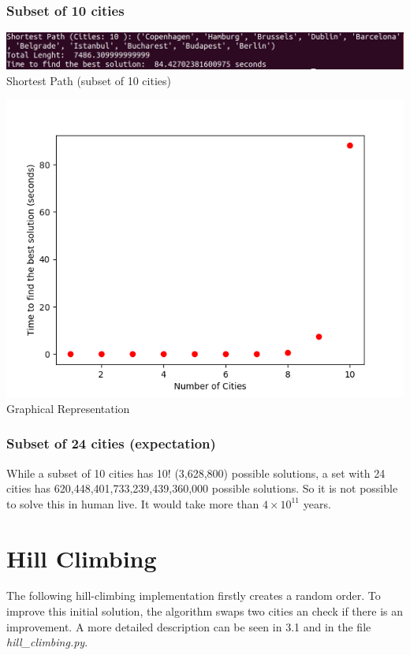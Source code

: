 \documentclass[10pt,a4paper]{article}
\begin{document}
	\subsubsection{Subset of 10 cities}
	\begin{center}
		\includegraphics[width=1\linewidth]{pictures/exhaustiveSearch/cities10}
		\\
		Shortest Path (subset of 10 cities)
		\\
	\end{center}
	\begin{center}
		\includegraphics[width=0.8\linewidth]{pictures/exhaustiveSearch/exhaustive_search10}
		\\
		Graphical Representation
		\\
	\end{center}
	
	
	\subsubsection{Subset of 24 cities (expectation)}
	While a subset of 10 cities has 10! (3,628,800) possible solutions, a set with 24 cities has  620,448,401,733,239,439,360,000 possible solutions. So it is not possible to solve this in human live. It would take more than $4\times10^{11}$ years.
	\section{Hill Climbing}
	The following hill-climbing implementation firstly creates a random order. To improve this initial solution, the algorithm swaps two cities an check if there is an improvement. A more detailed description can be seen in 3.1 and in the file \textit{hill\_climbing.py}.
\end{document}
